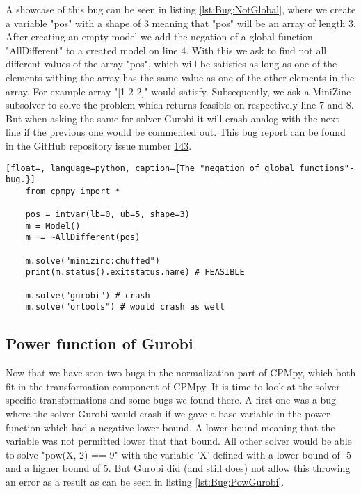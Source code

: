 A showcase of this bug can be seen in listing \ref{lst:Bug:NotGlobal}, where we create a variable "pos" with a shape of 3 meaning that "pos" will be an array of length 3. After creating an empty model we add the negation of a global function "AllDifferent" to a created model on line 4. With this we ask to find not all different values of the array "pos", which will be satisfies as long as one of the elements withing the array has the same value as one of the other elements in the array. For example array "[1 2 2]" would satisfy. Subsequently, we ask a MiniZinc subsolver to solve the problem which returns feasible on respectively line 7 and 8. But when asking the same for solver Gurobi it will crash analog with the next line if the previous one would be commented out. This bug report can be found in the GitHub repository issue number  \href{https://github.com/CPMpy/cpmpy/issues/143}{143}. 

\label{lst:Bug:NotGlobal}
\begin{lstlisting}[float=, language=python, caption={The "negation of global functions"-bug.}]
	from cpmpy import *

	pos = intvar(lb=0, ub=5, shape=3)
	m = Model()
	m += ~AllDifferent(pos)
	
	m.solve("minizinc:chuffed")
	print(m.status().exitstatus.name) # FEASIBLE

	m.solve("gurobi") # crash
	m.solve("ortools") # would crash as well
\end{lstlisting}

\subsection{Power function of Gurobi}
\label{res:bug:Power}
Now that we have seen two bugs in the normalization part of CPMpy, which both fit in the transformation component of CPMpy. It is time to look at the solver specific transformations and some bugs we found there. A first one was a bug where the solver Gurobi would crash if we gave a base variable in the power function which had a negative lower bound. A lower bound meaning that the variable was not permitted lower that that bound. All other solver would be able to solve "pow(X, 2) == 9" with the variable 'X' defined with a lower bound of -5 and a higher bound of 5. But Gurobi did (and still does) not allow this throwing an error as a result as can be seen in listing \ref{lst:Bug:PowGurobi}.

